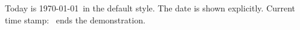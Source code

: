 \documentclass{article}
\begin{document}
Today is \today\ in the default style.
The date  is shown explicitly.
Current time stamp: \DTMnow\ ends the demonstration.
\end{document}
